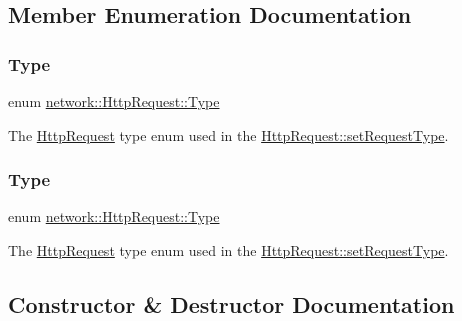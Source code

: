 \subsection{Member Enumeration Documentation}
\mbox{\label{classnetwork_1_1HttpRequest_abcc6d7ee2ea91a721d32fd6d396743fe}} 
\subsubsection{\texorpdfstring{Type}{Type}\hspace{0.1cm}{\footnotesize\ttfamily [1/2]}}
{\footnotesize\ttfamily enum \hyperlink{classnetwork_1_1HttpRequest_abcc6d7ee2ea91a721d32fd6d396743fe}{network\+::\+Http\+Request\+::\+Type}\hspace{0.3cm}{\ttfamily [strong]}}

The \hyperlink{classnetwork_1_1HttpRequest}{Http\+Request} type enum used in the \hyperlink{classnetwork_1_1HttpRequest_a07865a1628998a33a57e38cfe254e4cc}{Http\+Request\+::set\+Request\+Type}. \mbox{\label{classnetwork_1_1HttpRequest_abcc6d7ee2ea91a721d32fd6d396743fe}} 
\subsubsection{\texorpdfstring{Type}{Type}\hspace{0.1cm}{\footnotesize\ttfamily [2/2]}}
{\footnotesize\ttfamily enum \hyperlink{classnetwork_1_1HttpRequest_abcc6d7ee2ea91a721d32fd6d396743fe}{network\+::\+Http\+Request\+::\+Type}\hspace{0.3cm}{\ttfamily [strong]}}

The \hyperlink{classnetwork_1_1HttpRequest}{Http\+Request} type enum used in the \hyperlink{classnetwork_1_1HttpRequest_a07865a1628998a33a57e38cfe254e4cc}{Http\+Request\+::set\+Request\+Type}. 

\subsection{Constructor \& Destructor Documentation}
\mbox{\label{classnetwork_1_1HttpRequest_ae2e924419ee17ce1bbc87f0122688bb4}} 
